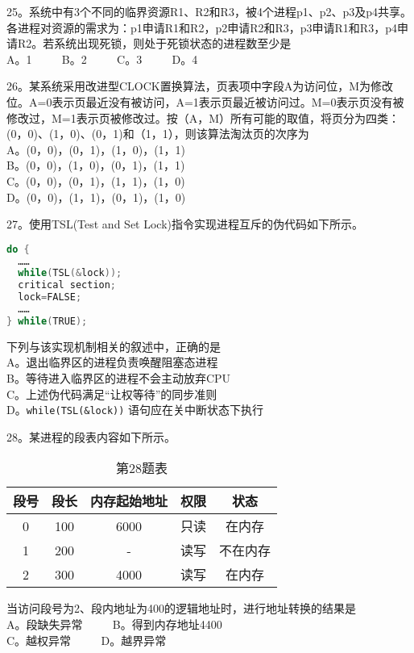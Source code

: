 25。系统中有3个不同的临界资源R1、R2和R3，被4个进程p1、p2、p3及p4共享。各进程对资源的需求为：p1申请R1和R2，p2申请R2和R3，p3申请R1和R3，p4申请R2。若系统出现死锁，则处于死锁状态的进程数至少是 \\
A。1 $\qquad$ B。2 $\qquad$ C。3 $\qquad$ D。4

26。某系统采用改进型CLOCK置换算法，页表项中字段A为访问位，M为修改位。A=0表示页最近没有被访问，A=1表示页最近被访问过。M=0表示页没有被修改过，M=1表示页被修改过。按（A，M）所有可能的取值，将页分为四类：(0，0)、(1，0)、(0，1)和（1，1），则该算法淘汰页的次序为 \\
A。(0，0)，(0，1)，(1，0)，(1，1) \\
B。(0，0)，(1，0)，(0，1)，(1，1) \\
C。(0，0)，(0，1)，(1，1)，(1，0) \\
D。(0，0)，(1，1)，(0，1)，(1，0)

27。使用TSL(Test and Set Lock)指令实现进程互斥的伪代码如下所示。 \\
\begin{lstlisting}[language=cpp]
do {
  ……
  while(TSL(&lock));
  critical section;
  lock=FALSE;
  ……
} while(TRUE);
\end{lstlisting}
下列与该实现机制相关的叙述中，正确的是 \\
A。退出临界区的进程负责唤醒阻塞态进程 \\
B。等待进入临界区的进程不会主动放弃CPU \\
C。上述伪代码满足“让权等待”的同步准则 \\
D。\verb`while(TSL(&lock))` 语句应在关中断状态下执行

28。某进程的段表内容如下所示。 \\
\begin{table}[ht]
\centering
\caption{第28题表}\label{tab_CSN16_4}
\begin{tabular}{|c|c|c|c|c|}
\hline
段号 & 段长 & 内存起始地址 & 权限 & 状态 \\
\hline
0 & 100 & 6000 & 只读 & 在内存 \\
\hline
1 & 200 & - & 读写 & 不在内存 \\
\hline
2 & 300 & 4000 & 读写 & 在内存 \\
\hline
\end{tabular}
\end{table}
当访问段号为2、段内地址为400的逻辑地址时，进行地址转换的结果是 \\
A。段缺失异常 $\qquad$ B。得到内存地址4400 \\
C。越权异常 $\qquad$ D。越界异常

